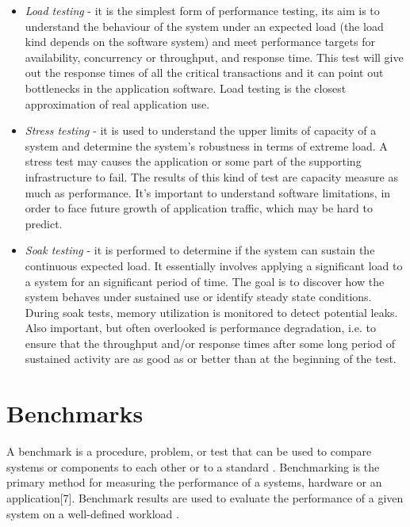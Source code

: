 \begin{itemize}
\item \textit{Load testing} - it is the simplest form of performance testing, its aim is to understand the behaviour of the system under an expected load (the load kind depends on the software system) and meet performance targets for availability, concurrency or throughput, and response time. This test will give out the response times of all the critical transactions and it can point out bottlenecks in the application software. Load testing is the closest approximation of real application use.

\item \textit{Stress testing} -  it is used to understand the upper limits of capacity of a system and determine the system's robustness in terms of extreme load. A stress test may causes the application or some part of the supporting infrastructure to fail. The results of this kind of test are  capacity measure as much as performance. It's important to understand software limitations, in order to face future growth of application traffic, which may be hard to predict.

\item \textit{ Soak testing} - it is performed to determine if the system can sustain the continuous expected load. It essentially involves applying a significant load to a system for an significant period of time. The goal is to discover how the system behaves under sustained use or identify steady state conditions. During soak tests, memory utilization is monitored to detect potential leaks. Also important, but often overlooked is performance degradation, i.e. to ensure that the throughput and/or response times after some long period of sustained activity are as good as or better than at the beginning of the test. 
\end{itemize} 

\section{Benchmarks}\label{sec:benchmarking}
A benchmark is a procedure, problem, or test that can be used to compare systems or components to each other or to a standard \cite{IEEEStd610.12-1990:glossary}. Benchmarking is the primary method for measuring the performance of a systems, hardware or an application[7]. Benchmark results are used to evaluate the performance of a given system on a well-defined workload \cite{Menasce:2001:CPW:560806}.

